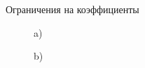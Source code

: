\documentclass{beamer}
\begin{document}
\begin{frame}{Ограничения на коэффициенты}
    \begin{figure}[H]
        \begin{minipage}[h]{0.35\linewidth}
             a) \\
        \end{minipage}
        \hfill
        \begin{minipage}[h]{0.35\linewidth}
             b) \\
        \end{minipage}
        \vfill
        \begin{minipage}[h]{0.35\linewidth}

\end{minipage}
\end{figure}
\end{frame}
\end{document}
